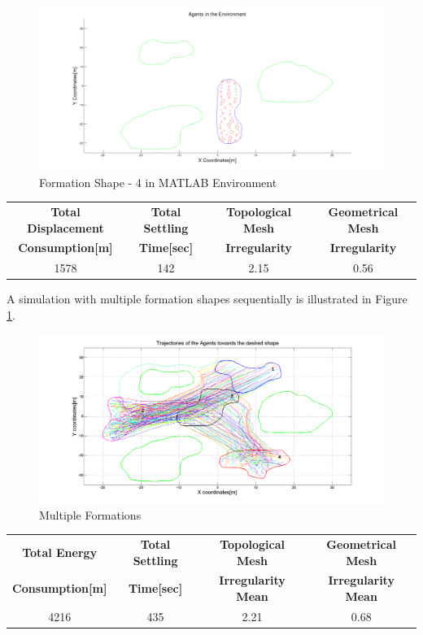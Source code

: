\begin{figure}[H]
\caption{Formation Shape - 4 in MATLAB Environment}
\centerline{\includegraphics[scale = 0.32]{4}}
\end{figure} 
			
\begin{center}
 \label{perf_shape4} 
\begin{tabular}{||c| c |c |c ||}
\hline
\textbf{Total Displacement }  & \textbf{Total Settling} & \textbf{Topological Mesh} & \textbf{Geometrical Mesh} \\ \textbf{Consumption[m]} & \textbf{Time[sec]}& \textbf{Irregularity} & \textbf{Irregularity} \\
\hline
1578 & 142 &  2.15& 0.56\\
\hline
\end{tabular}
\end{center}
		
A simulation with multiple formation shapes sequentially is illustrated in Figure \ref{multiple_formation_ref}.

\begin{figure}[H]
\caption{Multiple Formations} \label{multiple_formation_ref}
\centerline{\includegraphics[scale = 0.33]{multiple_formation}}
\end{figure} 
		
\begin{center}
 \label{perf_multiple} 
\begin{tabular}{||c| c |c |c ||}
\hline
\textbf{Total Energy }  & \textbf{Total Settling} & \textbf{Topological Mesh} & \textbf{Geometrical Mesh} \\ \textbf{Consumption[m]} & \textbf{Time[sec]}& \textbf{Irregularity Mean} & \textbf{Irregularity Mean} \\
\hline
4216 & 435 &  2.21& 0.68\\
\hline
\end{tabular}
\end{center}
		